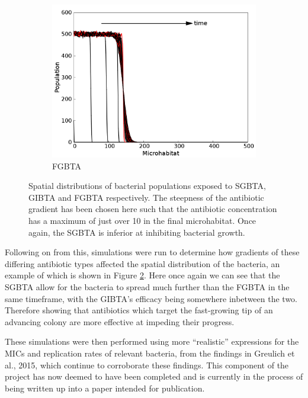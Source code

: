 \documentclass[a4paper,12pt]{article}
\begin{document}
\begin{figure}[H]
\begin{subfigure}[h]{0.3\textwidth}
  \includegraphics[width=\textwidth]{simple-fastGrowers-alpha=0_004884694070738408-spatialDistb}
  \caption{FGBTA}
  \label{subfig:FGBTA-spatdistb-spef_alpha}
 \end{subfigure}
\caption{Spatial distributions of bacterial populations exposed to SGBTA, GIBTA and FGBTA respectively.  The steepness of the antibiotic gradient has been chosen here such that 
the antibiotic concentration has a maximum of just over 10 in the final microhabitat.  Once again, the SGBTA is inferior at inhibiting bacterial growth.}
\label{fig:alpha-spatdistbs}
\end{figure}


Following on from this, simulations were run to determine how gradients of these differing antibiotic types affected the spatial distribution of the bacteria, an example of which is 
shown in Figure \ref{fig:alpha-spatdistbs}.  Here once again we can see that the SGBTA allow for the bacteria to spread much further than the FGBTA in the same timeframe, with the 
GIBTA's efficacy being somewhere inbetween the two.  Therefore showing that antibiotics which target the fast-growing tip of an advancing colony are more effective at impeding their 
progress.  

These simulations were then performed using more ``realistic'' expressions for the MICs and replication rates of relevant bacteria, from the findings in Greulich et al., 2015, which 
continue to corroborate these findings.  This component of the project has now deemed to have been completed and is currently in the process of being written up into a paper intended 
for publication.
\end{document}
